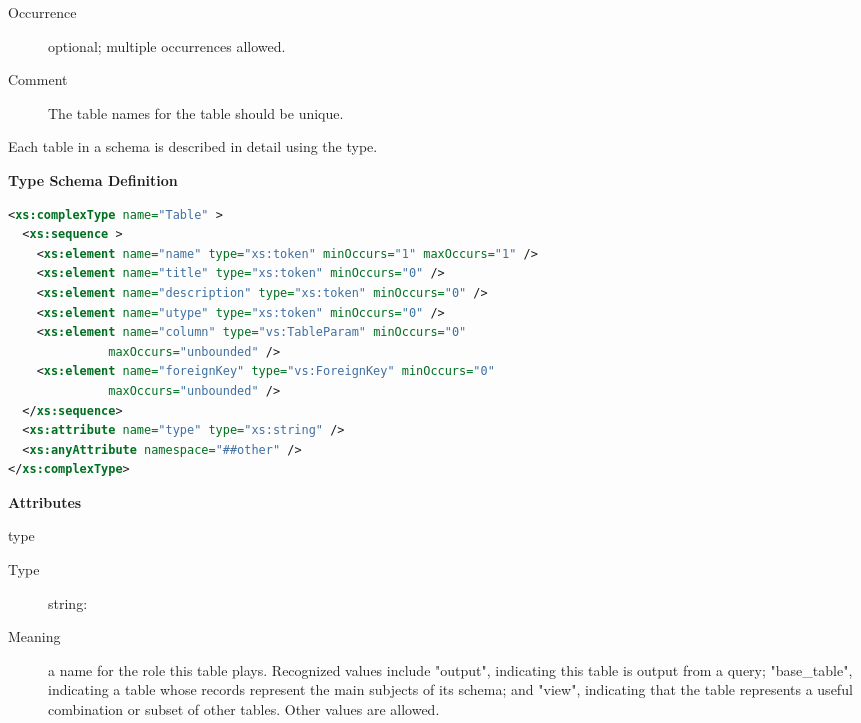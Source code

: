 \documentclass[11pt,a4paper]{ivoa}
\begin{document}
\begin{generated}
\begin{bigdescription}
\begin{description}
\item[Occurrence] optional; multiple occurrences allowed.
\item[Comment] 
               The table names for the table should be unique.
             

\end{description}


\end{bigdescription}\endgroup

\endgroup
\end{generated}



Each table in a schema is described in detail using the
 type.



\begin{generated}
\begingroup
      	\renewcommand*\descriptionlabel[1]{%
      	\hbox to 5.5em{\emph{#1}\hfil}}\vspace{1ex}\noindent\textbf{ Type Schema Definition}

\begin{lstlisting}[language=XML,basicstyle=\footnotesize]
<xs:complexType name="Table" >
  <xs:sequence >
    <xs:element name="name" type="xs:token" minOccurs="1" maxOccurs="1" />
    <xs:element name="title" type="xs:token" minOccurs="0" />
    <xs:element name="description" type="xs:token" minOccurs="0" />
    <xs:element name="utype" type="xs:token" minOccurs="0" />
    <xs:element name="column" type="vs:TableParam" minOccurs="0"
              maxOccurs="unbounded" />
    <xs:element name="foreignKey" type="vs:ForeignKey" minOccurs="0"
              maxOccurs="unbounded" />
  </xs:sequence>
  <xs:attribute name="type" type="xs:string" />
  <xs:anyAttribute namespace="##other" />
</xs:complexType>
\end{lstlisting}

\vspace{0.5ex}\noindent\textbf{ Attributes}

\begingroup\small\begin{bigdescription}
\item[type]
\begin{description}
\item[Type] string: 
\item[Meaning] 
               a name for the role this table plays.  Recognized
               values include {"}output{"}, indicating this table is output 
               from a query; {"}base\_table{"}, indicating a table
               whose records represent the main subjects of its
               schema; and {"}view{"}, indicating that the table represents
               a useful combination or subset of other tables.  Other 
               values are allowed.  
            

\end{description}
\end{bigdescription}
\end{generated}
\end{document}
